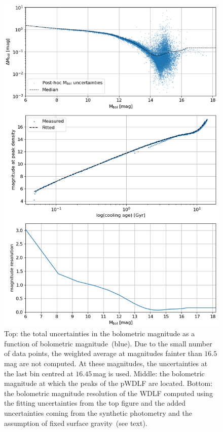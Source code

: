 \documentclass[fleqn,usenatbib]{mnras}
\begin{document}
\begin{figure}
    \includegraphics[width=\columnwidth]{figures/fig_03_mbol_sigma_magnitude_resoltuion.png}
    \caption{Top: the total uncertainties in the bolometric magnitude as a 
    function of bolometric magnitude~(blue). Due to the small
    number of data points, the weighted average at magnitudes fainter than
    $16.5$\,mag are not computed. At these magnitudes, the uncertainties at the
    last bin centred at $16.45$\,mag is used. Middle: the bolometric magnitude
    at which the peaks of the pWDLF are located. Bottom: the bolometric
    magnitude resolution of the WDLF computed using the fitting uncertainties
    from the top figure and the added uncertainties coming from the synthetic
    photometry and the assumption of fixed surface gravity~(see text).
    }
    \label{fig:magnitude_resolution}
\end{figure}
\end{document}
